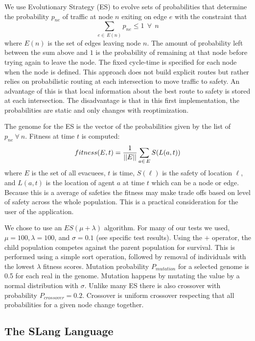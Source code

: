 \documentclass{sig-alternate-05-2015}
\begin{document}
We use Evolutionary Strategy (ES) \cite{Eiben15} to evolve sets of
probabilities that determine the probability $p_{ne}$
of traffic at node $n$ exiting on edge $e$ with the constraint
that
\begin{equation}
\sum_{e\in\,E(n)}  p_{ne} \leq 1 ~~ \forall ~~ n
\end{equation}
\noindent
where $E(n)$ is the set of edges leaving node $n$.
The amount of probability left between the sum above and $1$ is the
probability of remaining at that node before trying again to leave the
node.  The fixed cycle-time is specified for each node when the node
is defined.  This approach does not build explicit routes but rather
relies on probabilistic routing at each intersection to move traffic
to safety.  An advantage of this is that local information about the
best route to safety is stored at each intersection.  The disadvantage
is that in this first implementation, the probabilities are static and
only changes with reoptimization.

The genome for the ES is the vector of the probabilities given by the
list of $p_{ne} ~\forall~ n$.  Fitness at time $t$ is computed:
\begin{equation}
fitness(E, t) = \frac{1}{||E||} \sum_{a \in\, E} S(L(a, t))
\label{eq:safety}
\end{equation}
\noindent
where $E$ is the set of all evacuees, $t$ is time, $S(\ell)$ is the
safety of location $\ell$, and $L(a, t)$ is the location of agent $a$
at time $t$ which can be a node or edge.  Because this is a average of
safeties the fitness may make trade offs based on level of safety
across the whole population.  This is a practical consideration for
the user of the application.

We chose to use an $ES(\mu + \lambda)$ algorithm.  For many of our
tests we used, $\mu = 100, \lambda = 100$, and $\sigma = 0.1$ (see
specific test results).  Using the $+$ operator, the child population
competes against the parent population for survival.  This is
performed using a simple sort operation, followed by removal of
individuals with the lowest $\lambda$ fitness scores.  Mutation
probability $P_{mutation}$ for a selected genome is 0.5 for each real
in the genome.  Mutation happens by mutating the value by a normal
distribution with $\sigma$.  Unlike many ES there is also crossover
with probability $P_{crossover}=0.2$.  Crossover is uniform crossover
respecting that all probabilities for a given node change together.

\subsection{The SLang Language}
\end{document}

